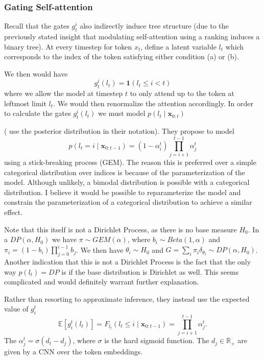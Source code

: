 \documentclass{article}
\newcommand\E[1]{\mathbb{E}\left[#1\right]}
\newcommand{\bx}{\mathbf{x}}
\newcommand{\R}{\mathbb{R}}
\begin{document}
\subsubsection{Gating Self-attention}
\label{subsec:gates}
Recall that the gates $g^i_t$ also indirectly induce tree structure
(due to the previously stated insight that modulating self-attention
using a ranking induces a binary tree).
At every timestep for token $x_t$,
\citet{shen2018prpn} define a latent variable $l_t$ which corresponds to the index of the 
token satisfying either condition (a) or (b).

We then would have $$g^i_t(l_t) = \mathbf{1}(l_t \le i < t)$$
where we allow the model at timestep $t$ to only attend up to the token at leftmost limit $l_t$.
We would then renormalize the attention accordingly.
In order to calculate the gates $g^i_t(l_t)$ we must model $p(l_t\mid\bx_{0:t})$ 

(\citet{shen2018prpn} use the posterior distribution in their notation).
They propose to model 
$$p(l_t=i\mid\bx_{0:t-1})=(1-\alpha_i^t)\prod_{j=i+1}^{t-1}\alpha_j^t$$
using a stick-breaking process (GEM).
The reason this is preferred over a simple categorical distribution over indices is because
of the parameterization of the model.
Although unlikely, a bimodal distribution is possible with a categorical distribution.
I believe it would be possible to reparameterize the model and constrain the parameterization of a 
categorical distribution to achieve a similar effect.

Note that this itself is not a Dirichlet Process, as there is no base measure $H_0$.
In a $DP(\alpha, H_0)$ we have $\pi \sim GEM(\alpha)$,
where $b_i \sim Beta(1,\alpha)$ and $\pi_i = (1-b_i)\prod_{j=0}^{i-1}b_j$.
We then have $\theta_i\sim H_0$ and $G = \sum_i\pi_i\delta_{\theta_i}\sim DP(\alpha, H_0)$.
Another indication that this is not a Dirichlet Process is the fact that
the only way $p(l_t) = DP$ is if the base distribution is Dirichlet as well.
This seems complicated and would definitely warrant further explanation.

Rather than resorting to approximate inference, they instead use the expected value of $g_i^t$
$$\E{g_i^t(l_t)} = F_{l_t}(l_t \le i\mid\bx_{0:t-1}) = \prod_{j=i+1}^{t-1}\alpha_j^t.$$
The $\alpha_j^t = \sigma(d_t - d_j)$, where $\sigma$ is the hard sigmoid function.
The $d_j\in\R_+$ are given by a CNN over the token embeddings.
\end{document}
